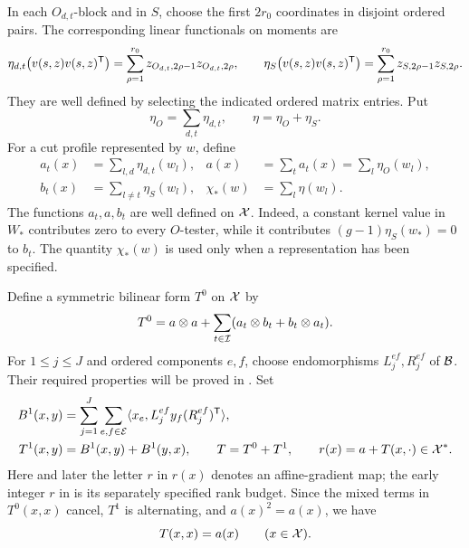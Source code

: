 In each \(O_{d,t}\)-block and in \(S\), choose the first \(2r_0\) coordinates in disjoint ordered pairs.
The corresponding linear functionals on moments are
\[
 \eta_{d,t}\bigl(v(s,z)v(s,z)^{\mathsf T}\bigr)
   =\sum_{\rho=1}^{r_0}z_{O_{d,t},2\rho-1}z_{O_{d,t},2\rho},
 \qquad
 \eta_S\bigl(v(s,z)v(s,z)^{\mathsf T}\bigr)
   =\sum_{\rho=1}^{r_0}z_{S,2\rho-1}z_{S,2\rho}.
\]
They are well defined by selecting the indicated ordered matrix entries.
Put
\[
 \eta_O=\sum_{d,t}\eta_{d,t},\qquad \eta=\eta_O+\eta_S.
\]
For a cut profile represented by \(w\), define
\begin{equation}\label{eq:cut-functionals}
 \begin{aligned}
 a_t(x)&=\sum_{l,d}\eta_{d,t}(w_l),&
 a(x)&=\sum_t a_t(x)=\sum_l\eta_O(w_l),\\
 b_t(x)&=\sum_{l\ne t}\eta_S(w_l),&
 \chi_*(w)&=\sum_l\eta(w_l).
 \end{aligned}
\end{equation}
The functions \(a_t,a,b_t\) are well defined on \(\mathcal X\).
Indeed, a constant kernel value in \(W_*\) contributes zero to every \(O\)-tester, while it contributes
\((g-1)\eta_S(w_*)=0\) to \(b_t\).
The quantity \(\chi_*(w)\) is used only when a representation has been specified.

Define a symmetric bilinear form \(T^0\) on \(\mathcal X\) by
\begin{equation}\label{eq:T-zero}
 T^0=a\otimes a+\sum_{t\in\mathcal I}(a_t\otimes b_t+b_t\otimes a_t).
\end{equation}
For \(1\le j\le J\) and ordered components \(e,f\), choose endomorphisms \(L_j^{ef},R_j^{ef}\) of \(\mathcal B\).
Their required properties will be proved in .
Set
\begin{equation}\label{eq:T-one}
 \begin{split}
 B^1(x,y)&=\sum_{j=1}^J\sum_{e,f\in\mathcal E}
   \langle x_e,L_j^{ef}y_f(R_j^{ef})^{\mathsf T}\rangle,\\
 T^1(x,y)&=B^1(x,y)+B^1(y,x),\qquad
 T=T^0+T^1,\qquad
 r(x)=a+T(x,\cdot)\in\mathcal X^*.
 \end{split}
\end{equation}
Here and later the letter \(r\) in \(r(x)\) denotes an affine-gradient map; the early integer \(r\) in  is its separately specified rank budget.
Since the mixed terms in \(T^0(x,x)\) cancel, \(T^1\) is alternating, and \(a(x)^2=a(x)\), we have
\begin{equation}\label{eq:T-diagonal}
 T(x,x)=a(x)\qquad(x\in\mathcal X).
\end{equation}

